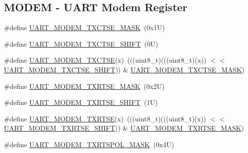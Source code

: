 \subsection*{M\+O\+D\+EM -\/ U\+A\+RT Modem Register}
\begin{DoxyCompactItemize}
\item 
\#define \mbox{\hyperlink{group___u_a_r_t___register___masks_ga00c7ea6d89eec98c2f6cc98651712c00}{U\+A\+R\+T\+\_\+\+M\+O\+D\+E\+M\+\_\+\+T\+X\+C\+T\+S\+E\+\_\+\+M\+A\+SK}}~(0x1\+U)
\item 
\#define \mbox{\hyperlink{group___u_a_r_t___register___masks_gafa34ecab8ca4ea8d72e3c42d846ce96d}{U\+A\+R\+T\+\_\+\+M\+O\+D\+E\+M\+\_\+\+T\+X\+C\+T\+S\+E\+\_\+\+S\+H\+I\+FT}}~(0\+U)
\item 
\#define \mbox{\hyperlink{group___u_a_r_t___register___masks_ga1d7f317bb31f92adff50ff7dc49e121b}{U\+A\+R\+T\+\_\+\+M\+O\+D\+E\+M\+\_\+\+T\+X\+C\+T\+SE}}(x)~(((uint8\+\_\+t)(((uint8\+\_\+t)(x)) $<$$<$ \mbox{\hyperlink{group___u_a_r_t___register___masks_gafa34ecab8ca4ea8d72e3c42d846ce96d}{U\+A\+R\+T\+\_\+\+M\+O\+D\+E\+M\+\_\+\+T\+X\+C\+T\+S\+E\+\_\+\+S\+H\+I\+FT}})) \& \mbox{\hyperlink{group___u_a_r_t___register___masks_ga00c7ea6d89eec98c2f6cc98651712c00}{U\+A\+R\+T\+\_\+\+M\+O\+D\+E\+M\+\_\+\+T\+X\+C\+T\+S\+E\+\_\+\+M\+A\+SK}})
\item 
\#define \mbox{\hyperlink{group___u_a_r_t___register___masks_gabcfa3a03c9114f74c35bb22c13261c1b}{U\+A\+R\+T\+\_\+\+M\+O\+D\+E\+M\+\_\+\+T\+X\+R\+T\+S\+E\+\_\+\+M\+A\+SK}}~(0x2\+U)
\item 
\#define \mbox{\hyperlink{group___u_a_r_t___register___masks_gadc29d3e7148a1f7a895a1db6442cc5b8}{U\+A\+R\+T\+\_\+\+M\+O\+D\+E\+M\+\_\+\+T\+X\+R\+T\+S\+E\+\_\+\+S\+H\+I\+FT}}~(1\+U)
\item 
\#define \mbox{\hyperlink{group___u_a_r_t___register___masks_gac312596f02740a89dc6254f0aeb84dd8}{U\+A\+R\+T\+\_\+\+M\+O\+D\+E\+M\+\_\+\+T\+X\+R\+T\+SE}}(x)~(((uint8\+\_\+t)(((uint8\+\_\+t)(x)) $<$$<$ \mbox{\hyperlink{group___u_a_r_t___register___masks_gadc29d3e7148a1f7a895a1db6442cc5b8}{U\+A\+R\+T\+\_\+\+M\+O\+D\+E\+M\+\_\+\+T\+X\+R\+T\+S\+E\+\_\+\+S\+H\+I\+FT}})) \& \mbox{\hyperlink{group___u_a_r_t___register___masks_gabcfa3a03c9114f74c35bb22c13261c1b}{U\+A\+R\+T\+\_\+\+M\+O\+D\+E\+M\+\_\+\+T\+X\+R\+T\+S\+E\+\_\+\+M\+A\+SK}})
\item 
\#define \mbox{\hyperlink{group___u_a_r_t___register___masks_ga83617aa9166494f2dbed5da69b5ae0ef}{U\+A\+R\+T\+\_\+\+M\+O\+D\+E\+M\+\_\+\+T\+X\+R\+T\+S\+P\+O\+L\+\_\+\+M\+A\+SK}}~(0x4\+U)
\item 

\end{DoxyCompactItemize}

